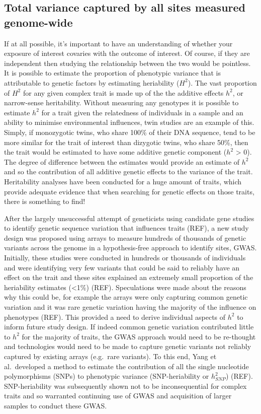 \documentclass[11pt,twoside]{bristolthesis}
\begin{document}
\hypertarget{heritability}{%
\subsection{Total variance captured by all sites measured genome-wide}\label{heritability}}

If at all possible, it's important to have an understanding of whether your exposure of interest covaries with the outcome of interest. Of course, if they are independent then studying the relationship between the two would be pointless. It is possible to estimate the proportion of phenotypic variance that is attributable to genetic factors by estimating heriability (\(H^2\)). The vast proportion of \(H^2\) for any given complex trait is made up of the the additive effects \(h^2\), or narrow-sense heritability. Without measuring any genotypes it is possible to estimate \(h^2\) for a trait given the relatedness of individuals in a sample and an ability to minimise environmental influences, twin studies are an example of this. Simply, if monozygotic twins, who share 100\% of their DNA sequence, tend to be more similar for the trait of interest than dizygotic twins, who share 50\%, then the trait would be estimated to have some additive genetic component (\(h^2\) \textgreater{} 0). The degree of difference between the estimates would provide an estimate of \(h^2\) and so the contribution of all additive genetic effects to the variance of the trait. Heritability analyses have been conducted for a huge amount of traits, which provide adequate evidence that when searching for genetic effects on those traits, there is something to find!

After the largely unsuccessful attempt of geneticists using candidate gene studies to identify genetic sequence variation that influences traits (REF), a new study design was proposed using arrays to measure hundreds of thousands of genetic variants across the genome in a hypothesis-free approach to identify sites, GWAS. Initially, these studies were conducted in hundreds or thousands of individuals and were identifying very few variants that could be said to reliably have an effect on the trait and these sites explained an extremely small proportion of the heriability estimates (\textless1\%) (REF). Speculations were made about the reasons why this could be, for example the arrays were only capturing common genetic variation and it was rare genetic variation having the majority of the influence on phenotypes (REF). This provided a need to derive individual aspects of \(h^2\) to inform future study design. If indeed common genetic variation contributed little to \(h^2\) for the majority of traits, the GWAS approach would need to be re-thought and technologies would need to be made to capture genetic variants not reliably captured by existing arrays (e.g.~rare variants). To this end, Yang et al.~developed a method to estimate the contribution of all the single nucleotide polymorphisms (SNPs) to phenotypic variance (SNP-heriability or \(h^2_{SNP}\)) (REF). SNP-heriability was subsequently shown not to be inconsequential for complex traits and so warranted continuing use of GWAS and acquisition of larger samples to conduct these GWAS.
\end{document}
